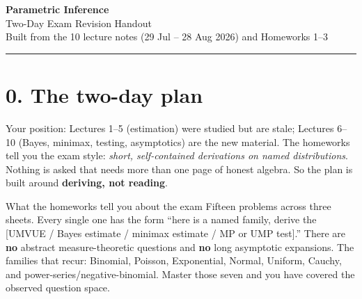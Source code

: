 \documentclass[11pt]{article}
\theoremstyle{remark}
\begin{document}
\begin{center}
{\LARGE\bfseries Parametric Inference}\\[2pt]
{\large Two-Day Exam Revision Handout}\\[4pt]
{\small Built from the 10 lecture notes (29 Jul -- 28 Aug 2026) and Homeworks 1--3}
\end{center}

\vspace{-4pt}
\hrule
\vspace{8pt}

\section*{0. The two-day plan}

Your position: Lectures 1--5 (estimation) were studied but are stale; Lectures 6--10
(Bayes, minimax, testing, asymptotics) are the new material. The homeworks tell you the
exam style: \emph{short, self-contained derivations on named distributions}. Nothing is
asked that needs more than one page of honest algebra. So the plan is built around
\textbf{deriving, not reading}.

\begin{keybox}{What the homeworks tell you about the exam}
Fifteen problems across three sheets. Every single one has the form ``here is a named
family, derive the [UMVUE / Bayes estimate / minimax estimate / MP or UMP test].''
There are \textbf{no} abstract measure-theoretic questions and \textbf{no} long asymptotic
expansions. The families that recur: Binomial, Poisson, Exponential, Normal, Uniform,
Cauchy, and power-series/negative-binomial. Master those seven and you have covered the
observed question space.
\end{keybox}
\end{document}
